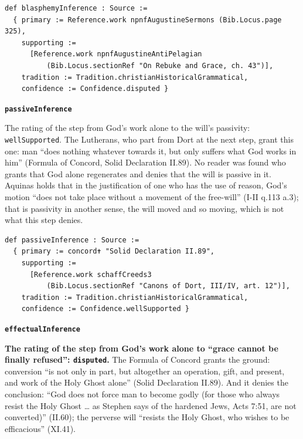 \documentclass[11pt]{article}
\begin{document}
{\small\begin{verbatim}
def blasphemyInference : Source :=
  { primary := Reference.work npnfAugustineSermons (Bib.Locus.page 325),
    supporting :=
      [Reference.work npnfAugustineAntiPelagian
          (Bib.Locus.sectionRef "On Rebuke and Grace, ch. 43")],
    tradition := Tradition.christianHistoricalGrammatical,
    confidence := Confidence.disputed }
\end{verbatim}}
\par\medskip\noindent\textbf{\texttt{passive\allowbreak{}Inference}}\par\nobreak\noindent
The rating of the step from God’s work alone to the will’s passivity: \texttt{well\allowbreak{}Supported}. The Lutherans, who part from Dort at the next step, grant this one: man “does nothing whatever towards it, but only suffers what God works in him” (Formula of Concord, Solid Declaration II.89). No reader was found who grants that God alone regenerates and denies that the will is passive in it. Aquinas holds that in the justification of one who has the use of reason, God’s motion “does not take place without a movement of the free-will” (I-II q.113 a.3); that is passivity in another sense, the will moved and so moving, which is not what this step denies.

{\small\begin{verbatim}
def passiveInference : Source :=
  { primary := concord✝ "Solid Declaration II.89",
    supporting :=
      [Reference.work schaffCreeds3
          (Bib.Locus.sectionRef "Canons of Dort, III/IV, art. 12")],
    tradition := Tradition.christianHistoricalGrammatical,
    confidence := Confidence.wellSupported }
\end{verbatim}}
\par\medskip\noindent\textbf{\texttt{effectual\allowbreak{}Inference}}\par\nobreak\noindent
\textbf{The rating of the step from God’s work alone to “grace cannot be finally refused”: \texttt{disputed}.} The Formula of Concord grants the ground: conversion “is not only in part, but altogether an operation, gift, and present, and work of the Holy Ghost alone” (Solid Declaration II.89). And it denies the conclusion: “God does not force man to become godly (for those who always resist the Holy Ghost … as Stephen says of the hardened Jews, Acts 7:51, are not converted)” (II.60); the perverse will “resists the Holy Ghost, who wishes to be efficacious” (XI.41).
\end{document}
